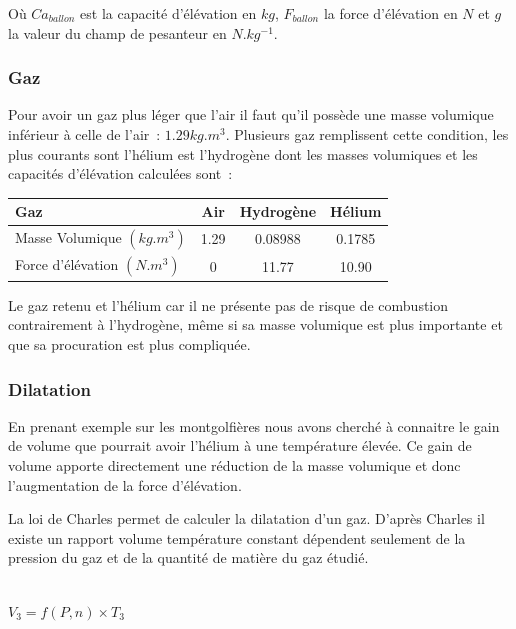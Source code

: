 \documentclass[a4paper,11pt]{article}
\begin{document}
Où $Ca_{ballon}$ est la capacité d'élévation en $kg$, $F_{ballon}$ la force d'élévation en $N$ et $g$ la valeur du champ de pesanteur en $N.kg^{-1}$.

\subsubsection{Gaz}

Pour avoir un gaz plus léger que l'air il faut qu'il possède une masse volumique inférieur à celle de l'air~: $1.29kg.m^3$. Plusieurs gaz remplissent cette condition, les plus courants sont l'hélium est l'hydrogène dont les masses volumiques et les capacités d'élévation calculées sont~:

\begin{center}
	\begin{tabular}{|l|c|c|c|}
		\hline
		Gaz & Air & Hydrogène & Hélium \\
		\hline
		Masse Volumique $(kg.m^3)$ & 1.29 & 0.08988 & 0.1785 \\
		\hline
		Force d'élévation $(N.m^3)$ & 0 & 11.77 & 10.90 \\
		\hline
	\end{tabular}
\end{center}

Le gaz retenu et l'hélium car il ne présente pas de risque de combustion contrairement à l'hydrogène, même si sa masse volumique est plus importante et que sa procuration est plus compliquée.

\subsubsection{Dilatation}

En prenant exemple sur les montgolfières nous avons cherché à connaitre le gain de volume que pourrait avoir l'hélium à une température élevée. Ce gain de volume apporte directement une réduction de la masse volumique et donc l'augmentation de la force d'élévation.

La loi de Charles permet de calculer la dilatation d'un gaz. D'après Charles il existe un rapport volume température constant dépendent seulement de la pression du gaz et de la quantité de matière du gaz étudié.

\begin{center}
  \\
 $\displaystyle{V_3 = f(P, n) \times T_3}$
\end{center}
\end{document}
